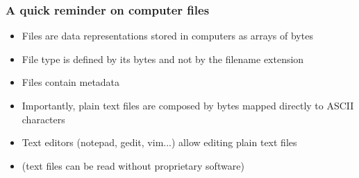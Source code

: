 \documentclass{beamer}
\begin{document}








\begin{frame}
  \frametitle{A quick reminder on computer files}
  \begin{itemize}
  \item  Files are data representations stored in computers as arrays of bytes
  \item File type is defined by its bytes and not by the filename extension
  \item Files contain metadata
  \item Importantly, plain text files are composed by bytes mapped directly to ASCII characters
  \item Text editors (notepad, gedit, vim...) allow editing plain text files
  \item (text files can be read without proprietary software)
  \end{itemize}
\end{frame}
\end{document}
